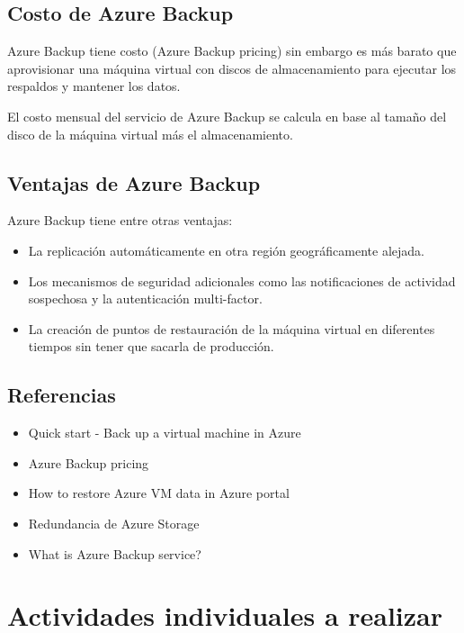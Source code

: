 \section{Costo de Azure Backup}

Azure Backup tiene costo (Azure Backup pricing) sin embargo es más barato que aprovisionar una máquina virtual con discos de almacenamiento para ejecutar los respaldos y mantener los datos.

El costo mensual del servicio de Azure Backup se calcula en base al tamaño del disco de la máquina virtual más el almacenamiento.

\section{Ventajas de Azure Backup}

Azure Backup tiene entre otras ventajas:

\begin{itemize}
\item La replicación automáticamente en otra región geográficamente alejada.
\item Los mecanismos de seguridad adicionales como las notificaciones de actividad sospechosa y la autenticación multi-factor.
\item La creación de puntos de restauración de la máquina virtual en diferentes tiempos sin tener que sacarla de producción.
\end{itemize}

\section{Referencias}

\begin{itemize}
\item Quick start - Back up a virtual machine in Azure
\item Azure Backup pricing
\item How to restore Azure VM data in Azure portal
\item Redundancia de Azure Storage
\end{itemize}

\begin{itemize}
\item What is Azure Backup service?
\end{itemize}

\chapter{Actividades individuales a realizar}


